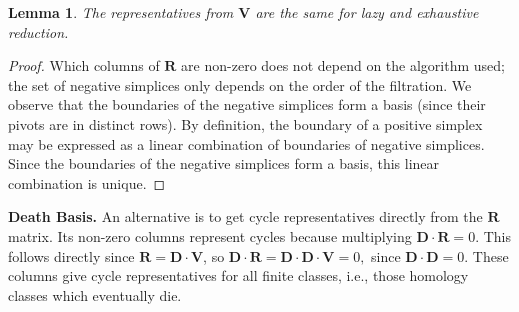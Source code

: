\documentclass{article}
\newtheorem{lemma}[theorem]{Lemma}
\newcommand{\mat}[1]{\mathbf{#1}}
\renewcommand{\paragraph}[1]{\noindent\textbf{#1.}}
\begin{document}
\begin{lemma}
The representatives from $\mat{V}$ are the same for lazy and exhaustive reduction.
\end{lemma}
\begin{proof}
    Which columns of $\mat{R}$ are non-zero does not depend on the algorithm used; the set of negative simplices only depends on the order of the filtration. We observe that the boundaries of the negative simplices form a basis (since their pivots are in distinct rows). By definition, the boundary of a positive simplex may be expressed as a linear combination of boundaries of negative simplices.
Since the boundaries of the negative simplices form a basis, this linear combination is unique. 
\end{proof}


\paragraph{\textbf{Death Basis}} An alternative is to get cycle representatives directly from the $\mat{R}$ matrix. Its non-zero columns represent cycles because multiplying $\mat{D}\cdot \mat{R} = 0$. This follows directly since $\mat{R}= \mat{D}\cdot\mat{V} $, so  
$\mat{D}\cdot \mat{R} =  \mat{D}\cdot \mat{D}\cdot\mat{V} = 0,$
since $\mat{D}\cdot \mat{D} =0.$
These columns give cycle representatives for all finite classes, i.e., those homology classes which eventually die.
\end{document}
